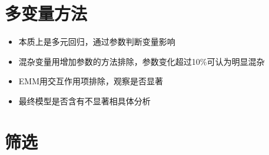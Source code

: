 \documentclass[]{book}
\providecommand{\tightlist}{%
  \setlength{\itemsep}{0pt}\setlength{\parskip}{0pt}}
\begin{document}
\hypertarget{ux591aux53d8ux91cfux65b9ux6cd5}{%
\section{多变量方法}\label{ux591aux53d8ux91cfux65b9ux6cd5}}

\begin{itemize}
\tightlist
\item
  本质上是多元回归，通过参数判断变量影响
\item
  混杂变量用增加参数的方法排除，参数变化超过10\%可认为明显混杂
\item
  EMM用交互作用项排除，观察是否显著
\item
  最终模型是否含有不显著相具体分析
\end{itemize}

\hypertarget{ux7b5bux9009}{%
\section{筛选}\label{ux7b5bux9009}}
\end{document}
